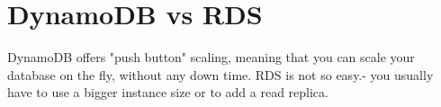 \documentclass{article}
\begin{document}
\section{DynamoDB vs RDS}
DynamoDB offers "push button" scaling, meaning that you can scale your database on the fly, without any down time. RDS is not so easy.- you usually have to use a bigger instance size or to add a read replica.
\end{document}
